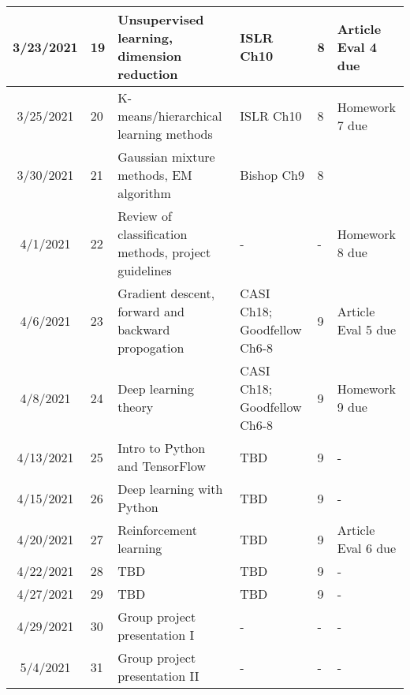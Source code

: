 \documentclass[11pt]{article}
\begin{document}
\begin{center}
\begin{tabular}{c|m{3em}|m{21em}|m{7em}|m{3em}|m{8em}}
3/23/2021 & 19 & Unsupervised learning, dimension reduction & ISLR Ch10 & 8 & Article Eval 4 due \\ \hline
3/25/2021 & 20 & K-means/hierarchical learning methods & ISLR Ch10 &  8 & Homework 7 due \\ \hline
3/30/2021 & 21 & Gaussian mixture methods, EM algorithm & Bishop Ch9 &  8 & \\ \hline
4/1/2021 & 22 & Review of classification methods, project guidelines & - & - & Homework 8 due \\ \hline
4/6/2021 & 23 & Gradient descent, forward and backward propogation & CASI Ch18; Goodfellow Ch6-8 &  9 & Article Eval 5 due \\ \hline
4/8/2021 & 24 & Deep learning theory & CASI Ch18; Goodfellow Ch6-8 & 9 & Homework 9 due\\ \hline
4/13/2021 & 25 & Intro to Python and TensorFlow & TBD & 9 & -\\ \hline
4/15/2021 & 26 & Deep learning with Python & TBD & 9 & -\\ \hline
4/20/2021 & 27 & Reinforcement learning & TBD & 9 & Article Eval 6 due\\ \hline
4/22/2021 & 28 & TBD & TBD & 9 & -\\ \hline
4/27/2021 & 29 & TBD & TBD & 9 & -\\ \hline
4/29/2021 & 30 & Group project presentation I & - & - & -\\ \hline
5/4/2021 & 31 & Group project presentation II & - & - & - 
\end{tabular}
\end{center}
\end{document}
